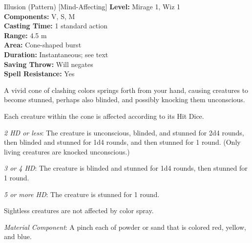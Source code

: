 {Illusion (Pattern) [Mind-Affecting]}
{
	\textbf{Level:}
	Mirage 1, Wiz 1\\
	\textbf{Components:}
	V, S, M\\
	\textbf{Casting Time:}
	1 standard action\\
	\textbf{Range:}
	4.5 m\\
	\textbf{Area:}
	Cone-shaped burst\\
	\textbf{Duration:}
	Instantaneous; see text\\
	\textbf{Saving Throw:}
	Will negates\\
	\textbf{Spell Resistance:}
	Yes\\
}
{
	A vivid cone of clashing colors springs forth from your hand, causing creatures to become stunned, perhaps also blinded, and possibly knocking them unconscious.

	Each creature within the cone is affected according to its Hit Dice.

	\textit{2 HD or less}:
	The creature is unconscious, blinded, and stunned for 2d4 rounds, then blinded and stunned for 1d4 rounds, and then stunned for 1 round. (Only living creatures are knocked unconscious.)

	\textit{3 or 4 HD}:
	The creature is blinded and stunned for 1d4 rounds, then stunned for 1 round.

	\textit{5 or more HD}:
	The creature is stunned for 1 round.

	Sightless creatures are not affected by color spray.

	\textit{Material Component}:
	A pinch each of powder or sand that is colored red, yellow, and blue.

}
